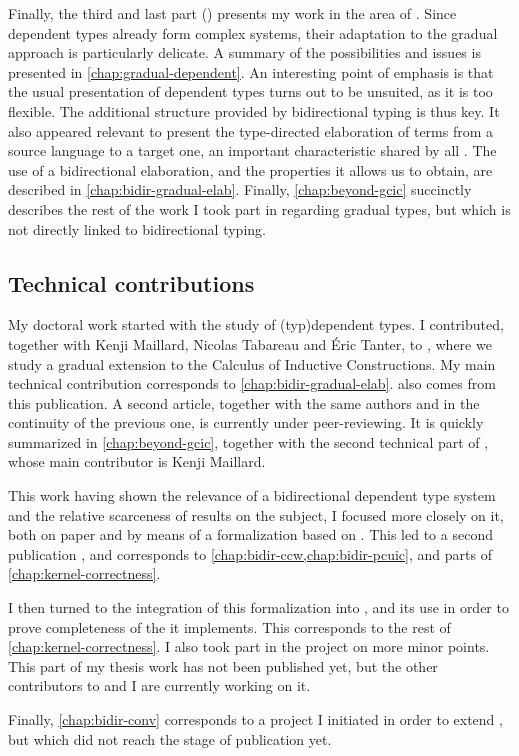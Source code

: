 Finally, the third and last part () presents my work in the area
of . Since dependent types already form complex systems, their adaptation
to the gradual approach is particularly delicate. A summary of the possibilities and issues is
presented in \cref{chap:gradual-dependent}. An interesting point of emphasis is that the
usual presentation of dependent types turns out to be unsuited, as it is too flexible.
The additional structure provided by bidirectional typing is thus key. It also
appeared relevant to present the type-directed elaboration of terms from a source language
to a target one, an important characteristic shared by all .
The use of a bidirectional elaboration, and the properties it allows us to obtain, are described
in \cref{chap:bidir-gradual-elab}. Finally, \cref{chap:beyond-gcic} succinctly describes the
rest of the work I took part in regarding gradual types, but which is not directly
linked to bidirectional typing.

\subsection{Technical contributions}

My doctoral work started with the study of  \kl(typ){dependent} types.
I contributed, together with Kenji Maillard, Nicolas Tabareau and Éric Tanter, to
, where we study a gradual extension to the
Calculus of Inductive Constructions. My main technical contribution corresponds
to \cref{chap:bidir-gradual-elab}.  also comes from this
publication. A second article, together with the same authors and in the continuity of the
previous one, is currently under peer-reviewing. It is quickly summarized in
\cref{chap:beyond-gcic}, together with the second technical part of
\textcite{LennonBertrand2022}, whose main contributor is Kenji Maillard.

This work having shown the relevance of a bidirectional dependent type system and the relative
scarceness of results on the subject, I focused more closely on it, both on
paper and by means of a formalization based on . This led to a second publication
, and corresponds to \cref{chap:bidir-ccw,chap:bidir-pcuic},
and parts of \cref{chap:kernel-correctness}.

I then turned to the integration of this formalization into , and its use
in order to prove completeness of the  it implements. This corresponds to the
rest of \cref{chap:kernel-correctness}. I also took part in the project on more minor points.
This part of my thesis work has not been published yet, but the other contributors to
 and I are currently working on it.

Finally, \cref{chap:bidir-conv} corresponds to a project I initiated in order to extend
, but which did not reach the stage of publication yet.